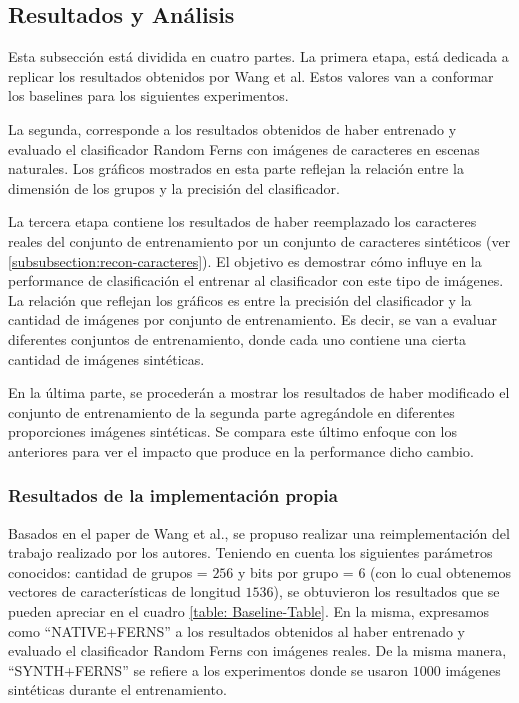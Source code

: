 \newpage
\subsection{Resultados  y Análisis}

\label{subsection:resultados}

	Esta subsección está dividida en cuatro partes. La primera etapa, está dedicada a replicar los resultados obtenidos por Wang et al. Estos valores van a conformar los baselines para los siguientes experimentos.

	La segunda, corresponde a los resultados obtenidos de haber entrenado y evaluado el clasificador Random Ferns con imágenes de caracteres en escenas naturales. Los gráficos mostrados en esta parte reflejan la relación entre la dimensión de los grupos y la precisión del clasificador.

	La tercera etapa contiene los resultados de haber reemplazado los caracteres reales del conjunto de entrenamiento por un conjunto de caracteres sintéticos (ver \ref{subsubsection:recon-caracteres}). El objetivo es demostrar cómo influye en la performance de clasificación el entrenar al clasificador con este tipo de imágenes. La relación que reflejan los gráficos es entre la precisión del clasificador y la cantidad de imágenes por conjunto de entrenamiento. Es decir, se van a evaluar diferentes conjuntos de entrenamiento, donde cada uno contiene una cierta cantidad de imágenes sintéticas.

	En la última parte, se procederán a mostrar los resultados de haber modificado el conjunto de entrenamiento de la segunda parte agregándole en diferentes proporciones imágenes sintéticas. Se compara este último enfoque con los anteriores para ver el impacto que produce en la performance dicho cambio.

	\subsubsection{Resultados de la implementación propia}
	\label{subsubsection: baseline-propio}

	Basados en el paper de Wang et al., se propuso realizar una reimplementación del trabajo realizado por los autores. Teniendo en cuenta los siguientes parámetros conocidos: cantidad de grupos = $256$ y bits por grupo = $6$ (con lo cual obtenemos vectores de características de longitud $1536$), se obtuvieron los resultados que se pueden apreciar en el cuadro \ref{table: Baseline-Table}. En la misma, expresamos como ``NATIVE+FERNS'' a los resultados obtenidos al haber entrenado y evaluado el clasificador Random Ferns con imágenes reales. De la misma manera, ``SYNTH+FERNS'' se  refiere a los experimentos donde se usaron $1000$ imágenes sintéticas durante el entrenamiento.

